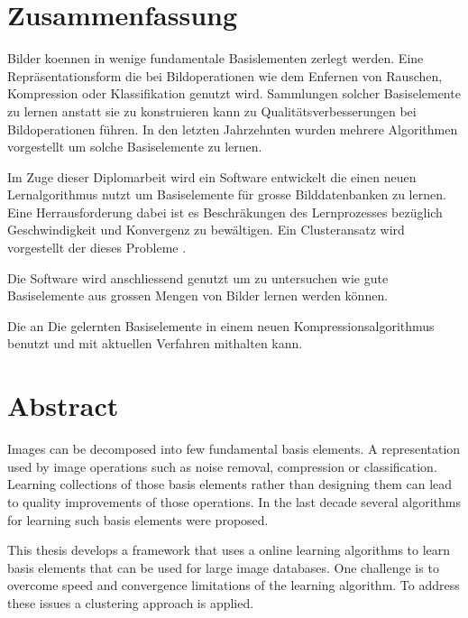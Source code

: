 \newpage
{}
{}
\chapter*{Zusammenfassung}
\thispagestyle{empty}

Bilder koennen in wenige fundamentale Basislementen zerlegt werden.
Eine Repr\"asentationsform die bei Bildoperationen wie dem
Enfernen von Rauschen, Kompression oder Klassifikation genutzt wird.
Sammlungen solcher Basiselemente zu lernen anstatt sie zu konstruieren kann
zu Qualit\"{a}tsverbesserungen bei Bildoperationen f\"{u}hren. 
In den letzten Jahrzehnten wurden mehrere Algorithmen vorgestellt um solche 
Basiselemente zu lernen.

Im Zuge dieser Diplomarbeit wird ein Software entwickelt die einen neuen
Lernalgorithmus nutzt um Basiselemente f\"ur grosse Bilddatenbanken
zu lernen. Eine Herrausforderung dabei ist es Beschr\"{a}kungen des
Lernprozesses bez\"{u}glich Geschwindigkeit und Konvergenz zu bew\"altigen. Ein
Clusteransatz wird vorgestellt der dieses Probleme .

Die Software wird anschliessend genutzt um zu untersuchen wie gute
Basiselemente aus grossen Mengen von Bilder lernen werden k\"{o}nnen. 

Die an Die gelernten Basiselemente in einem neuen Kompressionsalgorithmus
benutzt und mit aktuellen Verfahren mithalten kann.

\newpage
{}
{}
\chapter*{Abstract}
\thispagestyle{empty}

Images can be decomposed into few fundamental basis elements. 
A representation used by image operations such as noise removal,
compression or classification.
Learning collections of those basis elements rather than designing them can lead
to quality improvements of those operations. 
In the last decade several algorithms for learning such basis elements were
proposed.

This thesis develops a framework that uses a online learning
algorithms to learn basis elements that can be used for large image
databases. One challenge is to overcome speed and convergence limitations of the
learning algorithm. To address these issues a clustering approach is applied. 

